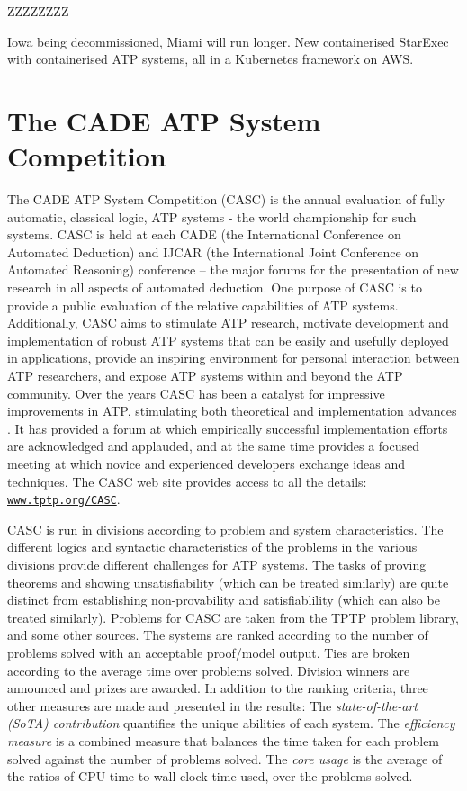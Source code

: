 \documentclass{easychair}
\begin{document}
ZZZZZZZZ

Iowa being decommissioned, Miami will run longer. New containerised StarExec with containerised
ATP systems, all in a Kubernetes framework on AWS.

\section{The CADE ATP System Competition}
\label{CASC}

The CADE ATP System Competition (CASC) \cite{Sut16} is the annual evaluation of fully automatic,
classical logic, ATP systems - the world championship for such systems.
CASC is held at each CADE (the International Conference on Automated Deduction) and IJCAR
(the International Joint Conference on Automated Reasoning) conference -- the major forums
for the presentation of new research in all aspects of automated deduction.
One purpose of CASC is to provide a public evaluation of the relative capabilities of ATP systems.
Additionally, CASC aims to
stimulate ATP research,
motivate development and implementation of robust ATP systems that can be easily and usefully
deployed in applications,
provide an inspiring environment for personal interaction between ATP researchers,
and
expose ATP systems within and beyond the ATP community.
Over the years CASC has been a catalyst for impressive improvements in ATP, stimulating both 
theoretical and implementation advances \cite{Nie02-Paper}.
It has provided a forum at which empirically successful implementation efforts are acknowledged 
and applauded, and at the same time provides a focused meeting at which novice and experienced 
developers exchange ideas and techniques. 
The CASC web site provides access to all the details:
\href{http://www.tptp.org/CASC/}{{\tt www.tptp.org/CASC}}.

CASC is run in divisions according to problem and system characteristics. 
The different logics and syntactic characteristics of the problems in the various divisions 
provide different challenges for ATP systems. 
The tasks of proving theorems and showing unsatisfiability (which can be treated similarly) are 
quite distinct from establishing non-provability and satisfiablility (which can also be treated 
similarly).
Problems for CASC are taken from the TPTP problem library, and some other sources. 
The systems are ranked according to the number of problems solved with an acceptable proof/model 
output.
Ties are broken according to the average time over problems solved.
Division winners are announced and prizes are awarded.
In addition to the ranking criteria, three other measures are made and
presented in the results:
The {\em state-of-the-art (SoTA) contribution} quantifies the unique
abilities of each system.
The {\em efficiency measure} is a combined measure that balances the time
taken for each problem solved against the number of problems solved.
The {\em core usage} is the average of the ratios of CPU time to
wall clock time used, over the problems solved.
\end{document}
